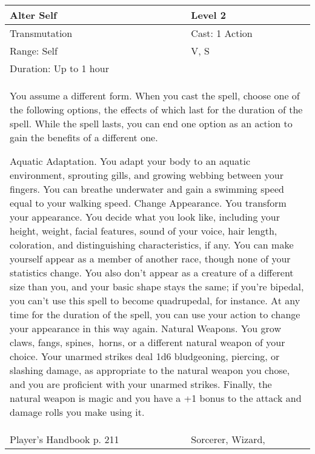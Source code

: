 \documentclass[11pt]{report}
\begin{document}
\begin{table}[H]
	\begin{tabular}{||p{6cm}|p{6cm}||}
		\hline\hline
		\bf{Alter Self} & Level 2\\ \hline
		Transmutation & Cast: 1 Action\\ \hline
		Range: Self & V, S\\ \hline
		Duration: Up to 1 hour & \\ \hline
		\multicolumn{2}{||p{12cm}||}{You assume a different form.
When you cast the spell, choose one of the following options, the effects of which last for the duration of the spell. While the spell lasts, you can end one option as an action to gain the benefits of a different one.

Aquatic Adaptation. You adapt your body to an aquatic environment, sprouting gills, and growing webbing between your fingers. You can breathe underwater and gain a swimming speed equal to your walking speed.
Change Appearance. You transform your appearance. You decide what you look like, including your height, weight, facial features, sound of your voice, hair length, coloration, and distinguishing characteristics, if any. You can make yourself appear as a member of another race, though none of your statistics change. You also don’t appear as a creature of a different size than you, and your basic shape stays the same; if you're bipedal, you can’t use this spell to become quadrupedal, for instance. At any time for the duration of the spell, you can use your action to change your appearance in this way again.
Natural Weapons. You grow claws, fangs, spines, horns, or a different natural weapon of your choice. Your unarmed strikes deal 1d6 bludgeoning, piercing, or slashing damage, as appropriate to the natural weapon you chose, and you are proficient with your unarmed strikes. Finally, the natural weapon is magic and you have a +1 bonus to the attack and damage rolls you make using it.}\\ \hline
Player's Handbook p. 211 & Sorcerer, Wizard, \\ \hline\hline
	\end{tabular}
\end{table}
\end{document}
